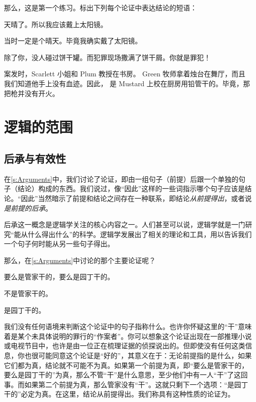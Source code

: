 \medskip

那么，这是第一个练习。标出下列每个论证中表达结论的短语：


\begin{compactlist}
	\item 天晴了。所以我应该戴上太阳镜。
	\item 当时一定是个晴天。毕竟我确实戴了太阳镜。
	\item 除了你，没人碰过饼干罐。而犯罪现场撒满了饼干屑。你就是罪犯！
	\item 案发时，Scarlett 小姐和 Plum 教授在书房。
	Green 牧师拿着烛台在舞厅，而且我们知道他手上没有血迹。因此，
	是 Mustard 上校在厨房用铅管干的。毕竟，那把枪并没有开火。
\end{compactlist}

\chapter{逻辑的范围}
\label{s:Valid}

\section{后承与有效性}

在\cref{s:Arguments}中，我们讨论了论证，即由一组句子（前提）后跟一个单独的句子（结论）构成的东西。我们说过，像“因此”这样的一些词指示哪个句子应该是结论。“因此”当然暗示了前提和结论之间存在一种联系，即结论\emph{从前提得出}，或者说\emph{是前提的后承}。

后承这一概念是逻辑学关注的核心内容之一。人们甚至可以说，逻辑学就是一门研究“能从什么得出什么”的科学。逻辑学发展出了相关的理论和工具，用以告诉我们一个句子何时能从另一些句子得出。

那么，在\cref{s:Arguments}中讨论的那个主要论证呢？


\begin{earg}
	\item[] 要么是管家干的，要么是园丁干的。
	\item[] 不是管家干的。
	\item[\texttherefore] 是园丁干的。
\end{earg}

我们没有任何语境来判断这个论证中的句子指称什么。也许你怀疑这里的“干”意味着是某个未具体说明的罪行的“作案者”。你可以想象这个论证出现在一部推理小说或电视节目中，也许是由一位正在梳理证据的侦探说出的。但即使没有任何这类信息，你也很可能同意这个论证是“好的”，其意义在于：无论前提指的是什么，如果它们都为真，结论就不可能不为真。如果第一个前提为真，即“要么是管家干的，要么是园丁干的”为真，那么不管“干”是什么意思，至少他们中有一人“干”了这回事。而如果第二个前提为真，那么管家没有“干”。这就只剩下一个选项：“是园丁干的”必定为真。在这里，结论从前提得出。我们称具有这种性质的论证为。

